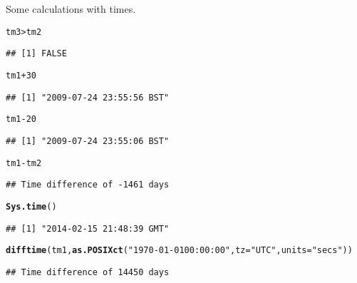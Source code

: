 \documentclass[12pt, a4paper, oneside]{article}\usepackage[]{graphicx}\usepackage[]{color}
\makeatletter
\newcommand{\hlstr}[1]{\textcolor[rgb]{0.192,0.494,0.8}{#1}}%
\newcommand{\hlkwd}[1]{\textcolor[rgb]{0.737,0.353,0.396}{\textbf{#1}}}%
\newenvironment{kframe}{%
 \def\at@end@of@kframe{}%
 \ifinner\ifhmode%
  \def\at@end@of@kframe{\end{minipage}}%
  \begin{minipage}{\columnwidth}%
 \fi\fi%
 \def\FrameCommand##1{\hskip\@totalleftmargin \hskip-\fboxsep
 \colorbox{shadecolor}{##1}\hskip-\fboxsep
     \hskip-\linewidth \hskip-\@totalleftmargin \hskip\columnwidth}%
 \MakeFramed {\advance\hsize-\width
   \@totalleftmargin\z@ \linewidth\hsize
   \@setminipage}}%
 {\par\unskip\endMakeFramed%
 \at@end@of@kframe}
\newenvironment{knitrout}{}{} %
\makeatother
\begin{document}
Some calculations with times. 
\begin{knitrout}
\color{fgcolor}\begin{kframe}
\begin{alltt}
tm3 > tm2
\end{alltt}
\begin{verbatim}
## [1] FALSE
\end{verbatim}
\begin{alltt}
tm1 + 30
\end{alltt}
\begin{verbatim}
## [1] "2009-07-24 23:55:56 BST"
\end{verbatim}
\begin{alltt}
tm1 - 20
\end{alltt}
\begin{verbatim}
## [1] "2009-07-24 23:55:06 BST"
\end{verbatim}
\begin{alltt}
tm1 - tm2
\end{alltt}
\begin{verbatim}
## Time difference of -1461 days
\end{verbatim}
\begin{alltt}
\hlkwd{Sys.time}()
\end{alltt}
\begin{verbatim}
## [1] "2014-02-15 21:48:39 GMT"
\end{verbatim}
\begin{alltt}
\hlkwd{difftime}(tm1, \hlkwd{as.POSIXct}(\hlstr{"1970-01-01 00:00:00"}, tz = \hlstr{"UTC"}, units = \hlstr{"secs"}))
\end{alltt}
\begin{verbatim}
## Time difference of 14450 days
\end{verbatim}
\end{kframe}
\end{knitrout}
\end{document}
